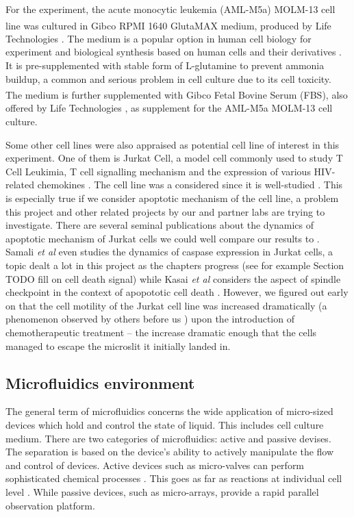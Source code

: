 \documentclass[pdftex,12pt,a4paper]{report}
\begin{document}
For the experiment, the acute monocytic leukemia (AML-M5a) MOLM-13 cell line was cultured in Gibco\textsuperscript{\textregistered} RPMI 1640 GlutaMAX medium, produced by Life Technologies \cite{gibcocellculture2017}. The medium is a popular option in human cell biology for experiment and biological synthesis based on human cells and their derivatives \cite{blight2000efficient, shimizu2002fabrication}. It is pre-supplemented with stable form of L-glutamine to prevent ammonia buildup, a common and serious problem in cell culture due to its cell toxicity\cite{satter1974effect}. The medium is further supplemented with Gibco\textsuperscript{\textregistered} Fetal Bovine Serum (FBS), also offered by Life Technologies \cite{gibcofbs2017}, as supplement for the AML-M5a MOLM-13 cell culture.


Some other cell lines were also appraised as potential cell line of interest in this experiment. One of them is Jurkat Cell, a model cell commonly used to study T Cell Leukimia, T cell signalling mechanism and the expression of various HIV-related chemokines \cite{schneider1977characterization}. The cell line was a considered since it is well-studied \cite{johnson2007genome, schena1996parallel}. This is especially true if we consider apoptotic mechanism of the cell line, a problem this project and other related projects by our  and partner labs are trying to investigate. There are several seminal publications about the dynamics of apoptotic mechanism of Jurkat cells we could well compare our results to \cite{gottlieb1996apoptosis}. Samali \textit{et al} \cite{samali1999presence} even studies the dynamics of caspase expression in Jurkat cells, a topic dealt a lot in this project as the chapters progress (see for example Section TODO fill on cell death signal) while Kasai \textit{et al} considers the aspect of spindle checkpoint in the context of apopototic cell death \cite{kasai2002prevalent}. However, we figured out early on that the cell motility of the Jurkat cell line was increased dramatically (a phenomenon observed by others before us \cite{barnhart2004cd95}) upon the introduction of chemotherapeutic treatment -- the increase dramatic enough that the cells managed to escape the microslit it initially landed in.


\subsection{Microfluidics environment}

The general term of microfluidics concerns the wide application of micro-sized devices which hold and control the state of liquid. This includes cell culture medium. There are two categories of microfluidics: active and passive devises. The separation is based on the device's ability to actively manipulate the flow and control of devices. Active devices such as micro-valves can perform sophisticated chemical processes \cite{marsden1993interdisciplinary}. This goes as far as reactions at individual cell level \cite{eyer2012microchamber}. While passive devices, such as micro-arrays, provide a rapid parallel observation platform.
\end{document}
